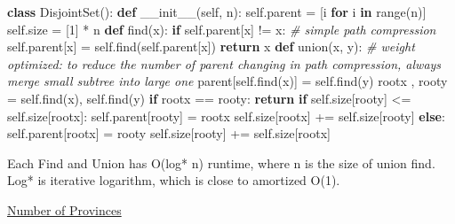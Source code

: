 \documentclass[
]{article}
\newenvironment{Shaded}{}{}
\newcommand{\BuiltInTok}[1]{#1}
\newcommand{\CommentTok}[1]{\textcolor[rgb]{0.38,0.63,0.69}{\textit{#1}}}
\newcommand{\ControlFlowTok}[1]{\textcolor[rgb]{0.00,0.44,0.13}{\textbf{#1}}}
\newcommand{\DecValTok}[1]{\textcolor[rgb]{0.25,0.63,0.44}{#1}}
\newcommand{\FunctionTok}[1]{\textcolor[rgb]{0.02,0.16,0.49}{#1}}
\newcommand{\KeywordTok}[1]{\textcolor[rgb]{0.00,0.44,0.13}{\textbf{#1}}}
\newcommand{\NormalTok}[1]{#1}
\newcommand{\OperatorTok}[1]{\textcolor[rgb]{0.40,0.40,0.40}{#1}}
\newcommand{\VariableTok}[1]{\textcolor[rgb]{0.10,0.09,0.49}{#1}}
\begin{document}
\begin{Shaded}
\begin{Highlighting}[]
\KeywordTok{class}\NormalTok{ DisjointSet():}
    \KeywordTok{def} \FunctionTok{\_\_init\_\_}\NormalTok{(}\VariableTok{self}\NormalTok{, n):}
        \VariableTok{self}\NormalTok{.parent }\OperatorTok{=}\NormalTok{ [i }\ControlFlowTok{for}\NormalTok{ i }\KeywordTok{in} \BuiltInTok{range}\NormalTok{(n)]}
        \VariableTok{self}\NormalTok{.size }\OperatorTok{=}\NormalTok{ [}\DecValTok{1}\NormalTok{] }\OperatorTok{*}\NormalTok{ n  }
    \KeywordTok{def}\NormalTok{ find(x):}
        \ControlFlowTok{if} \VariableTok{self}\NormalTok{.parent[x] }\OperatorTok{!=}\NormalTok{ x:}
            \CommentTok{\# simple path compression}
            \VariableTok{self}\NormalTok{.parent[x] }\OperatorTok{=} \VariableTok{self}\NormalTok{.find(}\VariableTok{self}\NormalTok{.parent[x])}
        \ControlFlowTok{return}\NormalTok{ x}
   	\KeywordTok{def}\NormalTok{ union(x, y):   }
        \CommentTok{\# weight optimized: to reduce the number of parent changing in path compression, always merge small subtree into large one}
\NormalTok{        parent[}\VariableTok{self}\NormalTok{.find(x)] }\OperatorTok{=} \VariableTok{self}\NormalTok{.find(y)}
\NormalTok{        rootx , rooty }\OperatorTok{=} \VariableTok{self}\NormalTok{.find(x), }\VariableTok{self}\NormalTok{.find(y)}
        \ControlFlowTok{if}\NormalTok{ rootx }\OperatorTok{==}\NormalTok{ rooty: }\ControlFlowTok{return}
        \ControlFlowTok{if} \VariableTok{self}\NormalTok{.size[rooty] }\OperatorTok{\textless{}=} \VariableTok{self}\NormalTok{.size[rootx]:}
            \VariableTok{self}\NormalTok{.parent[rooty] }\OperatorTok{=}\NormalTok{ rootx}
            \VariableTok{self}\NormalTok{.size[rootx] }\OperatorTok{+=} \VariableTok{self}\NormalTok{.size[rooty]}
        \ControlFlowTok{else}\NormalTok{:}
            \VariableTok{self}\NormalTok{.parent[rootx] }\OperatorTok{=}\NormalTok{ rooty}
            \VariableTok{self}\NormalTok{.size[rooty] }\OperatorTok{+=} \VariableTok{self}\NormalTok{.size[rootx]}
\end{Highlighting}
\end{Shaded}

Each Find and Union has O(log* n) runtime, where n is the size of union
find. Log* is iterative logarithm, which is close to amortized O(1).

\href{https://leetcode.com/problems/number-of-provinces}{Number of
Provinces}
\end{document}
